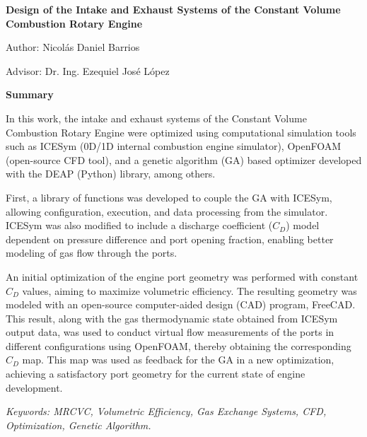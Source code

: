 \documentclass[oneside,a4paper,spanish,links,11pt]{book}
\begin{document}
\newpage
\thispagestyle{plain}
\begin{center}
\large{\textbf{{Design of the Intake and Exhaust Systems of the Constant Volume Combustion Rotary Engine}}}

\end{center}

\normalsize{

\hfill Author: Nicolás Daniel Barrios

\hfill Advisor: Dr. Ing. Ezequiel José López


\textbf{Summary}

In this work, the intake and exhaust systems of the Constant Volume Combustion
Rotary Engine were optimized using computational simulation tools such
as ICESym (0D/1D internal combustion engine simulator), OpenFOAM (open-source
CFD tool), and a genetic algorithm (GA) based optimizer developed with the DEAP
(Python) library, among others.

First, a library of functions was developed to couple the GA with ICESym,
allowing configuration, execution, and data processing from the simulator.
%
ICESym was also modified to include a discharge coefficient ($C_{D}$) model
dependent on pressure difference and port opening fraction, enabling better
modeling of gas flow through the ports.

An initial optimization of the engine port geometry was performed with constant
$C_{D}$ values, aiming to maximize volumetric efficiency.
%
The resulting geometry was modeled with an open-source computer-aided design
(CAD) program, FreeCAD.
%
This result, along with the gas thermodynamic state obtained from ICESym output
data, was used to conduct virtual flow measurements of the ports in different
configurations using OpenFOAM, thereby obtaining the corresponding $C_{D}$ map.
%
This map was used as feedback for the GA in a new optimization, achieving a
satisfactory port geometry for the current state of engine development.


\textit{Keywords: MRCVC, Volumetric Efficiency, Gas Exchange Systems, CFD, Optimization, Genetic Algorithm.}

\newpage




}
\end{document}
